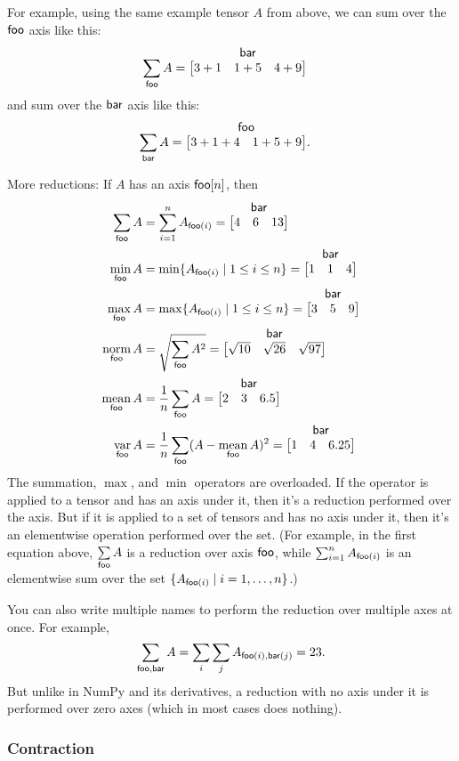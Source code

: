 \documentclass{article}
\makeatletter
\newcommand{\nmatrix}[3]{\name{#1}\begin{array}[b]{@{}c@{}}\name{#2}\\\begin{bmatrix}#3\end{bmatrix}\end{array}}
\makeatother
\begin{document}
For example, using the same example tensor $A$ from above, we can sum over the $\mathsf{foo}$ axis like this:
\begin{align*}
\nsum{foo} A &= \nmatrix{}{bar}{
  3+1 & 1+5 & 4+9
}
\end{align*}
and sum over the $\mathsf{bar}$ axis like this:
\begin{align*}
\nsum{bar} A &= \nmatrix{}{foo}{
  3+1+4 & 1+5+9
}.
\end{align*}

More reductions: If $A$ has an axis $\mathsf{foo}[n]$, then
\begin{align*}
  \nsum{foo} A &= \sum_{i=1}^n A_{\nidx{foo}{i}} = \nmatrix{}{bar}{4 & 6 & 13} \\
  \nfun{foo}{min} A &= \min \{A_{\nidx{foo}{i}} \mid 1 \leq i \leq n\} = \nmatrix{}{bar}{1 & 1 & 4} \\
  \nfun{foo}{max} A &= \max \{A_{\nidx{foo}{i}} \mid 1 \leq i \leq n\} = \nmatrix{}{bar}{3 & 5 & 9} \\
  \nfun{foo}{norm} A &= \sqrt{\nsum{foo} A^2} = \nmatrix{}{bar}{\sqrt{10} & \sqrt{26} & \sqrt{97}} \\
  \nfun{foo}{mean} A &= \frac{1}{n} \nsum{foo} A = \nmatrix{}{bar}{2 & 3 & 6.5} \\
  \nfun{foo}{var} A &= \frac{1}{n} \nsum{foo} (A - \nfun{foo}{mean} A)^2 = \nmatrix{}{bar}{1 & 4 & 6.25}
\end{align*}
The summation, $\max$, and $\min$ operators are overloaded. If the operator is applied to a tensor and has an axis under it, then it's a reduction performed over the axis. But if it is applied to a set of tensors and has no axis under it, then it's an elementwise operation performed over the set. (For example, in the first equation above, $\sum\limits_{\mathsf{foo}} A$ is a reduction over axis $\mathsf{foo}$, while $\sum_{i=1}^n A_{\mathsf{foo}(i)}$ is an elementwise sum over the set $\{A_{\mathsf{foo}(i)} \mid i=1, \ldots, n\}$.)

You can also write multiple names to perform the reduction over multiple axes at once. For example,
\begin{equation*}
  \sum\limits_{\mathsf{foo,bar}} A = \sum_i \sum_j A_{\mathsf{foo}(i),\mathsf{bar}(j)} = 23.
\end{equation*}
But unlike in NumPy and its derivatives, a reduction with no axis under it is performed over zero axes (which in most cases does nothing).

\subsubsection{Contraction}
\end{document}
